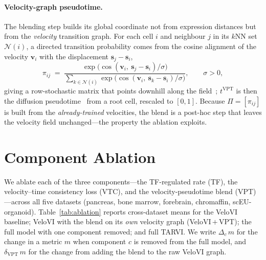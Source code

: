 \documentclass[11pt]{article}
\begin{document}
\paragraph{Velocity-graph pseudotime.} The blending step builds its global coordinate
not from expression distances but from the \emph{velocity} transition graph. For each
cell $i$ and neighbour $j$ in its $k$NN set $\mathcal{N}(i)$, a directed transition
probability comes from the cosine alignment of the velocity $\mathbf{v}_i$ with the
displacement $\mathbf{s}_j-\mathbf{s}_i$,
\begin{equation}
\pi_{ij} \;=\;
\frac{\exp\!\big(\cos(\mathbf{v}_i,\ \mathbf{s}_j-\mathbf{s}_i)/\sigma\big)}
{\sum_{k\in\mathcal{N}(i)}\exp\!\big(\cos(\mathbf{v}_i,\ \mathbf{s}_k-\mathbf{s}_i)/\sigma\big)},
\qquad \sigma>0 ,
\label{eq:transition}
\end{equation}
giving a row-stochastic matrix that points downhill along the field~\cite{bergen2020scvelo};
$t^{\text{VPT}}$ is then the diffusion pseudotime~\cite{haghverdi2016dpt} from a root
cell, rescaled to $[0,1]$. Because $\Pi=[\pi_{ij}]$ is built from the
\emph{already-trained} velocities, the blend is a post-hoc step that leaves the
velocity field unchanged---the property the ablation exploits.

\section{Component Ablation}
\label{sec:ablation}

We ablate each of the three components---the TF-regulated rate (TF), the
velocity--time consistency loss (VTC), and the velocity-pseudotime blend (VPT)---across
all five datasets (pancreas, bone marrow, forebrain, chromaffin, scEU-organoid).
Table~\ref{tab:ablation} reports cross-dataset means for the VeloVI baseline; VeloVI
with the blend on its \emph{own} velocity graph (VeloVI\,$+$\,VPT); the full model
with one component removed; and full TARVI. We write $\Delta_c\,m$ for the change in a
metric $m$ when component $c$ is removed from the full model, and
$\delta_{\text{VPT}}\,m$ for the change from adding the blend to the raw VeloVI graph.
\end{document}
